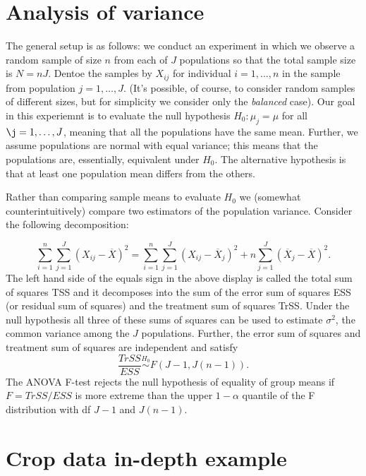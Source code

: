 \documentclass[
]{book}
\begin{document}
\hypertarget{analysis-of-variance}{%
\section{Analysis of variance}\label{analysis-of-variance}}

The general setup is as follows: we conduct an experiment in which we observe a random sample of size \(n\) from each of \(J\) populations so that the total sample size is \(N=nJ\). Dentoe the samples by \(X_{ij}\) for individual \(i=1, \ldots, n\) in the sample from population \(j=1,\ldots, J\). (It's possible, of course, to consider random samples of different sizes, but for simplicity we consider only the \emph{balanced} case). Our goal in this experiemnt is to evaluate the null hypothesis \(H_0: \mu_j = \mu\) for all \(\j = 1,\ldots, J\), meaning that all the populations have the same mean. Further, we assume populations are normal with equal variance; this means that the populations are, essentially, equivalent under \(H_0\). The alternative hypothesis is that at least one population mean differs from the others.

Rather than comparing sample means to evaluate \(H_0\) we (somewhat counterintuitively) compare two estimators of the population variance. Consider the following decomposition:

\[\sum_{i=1}^n\sum_{j=1}^J(X_{ij} - \overline X)^2 = \sum_{i=1}^n\sum_{j=1}^J (X_{ij} - \overline X_j)^2 + n\sum_{j=1}^J (\overline X_j - \overline X)^2.\]
The left hand side of the equals sign in the above display is called the total sum of squares TSS and it decomposes into the sum of the error sum of squares ESS (or residual sum of squares) and the treatment sum of squares TrSS. Under the null hypothesis all three of these sums of squares can be used to estimate \(\sigma^2\), the common variance among the \(J\) populations. Further, the error sum of squares and treatment sum of squares are independent and satisfy
\[\frac{TrSS}{ESS} \stackrel{H_0}{\sim}F(J-1, J(n-1)).\]
The ANOVA F-test rejects the null hypothesis of equality of group means if \(F = TrSS/ESS\) is more extreme than the upper \(1-\alpha\) quantile of the F distribution with df \(J-1\) and \(J(n-1)\).

\hypertarget{crop-data-in-depth-example}{%
\section{Crop data in-depth example}\label{crop-data-in-depth-example}}
\end{document}
